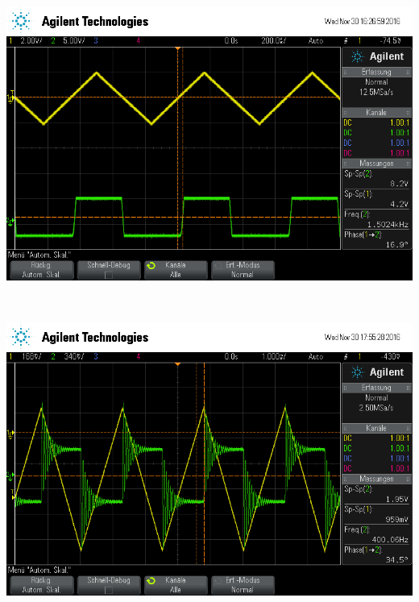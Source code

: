 \documentclass[]{scrartcl}
\begin{document}
\hspace{0.1\textwidth}
\begin{minipage}[t]{0.5\textwidth}
	\includegraphics[width=\textwidth]{images/rechteck_diff}
	\label{fig:rechteckdiff}
\end{minipage} \\
\begin{minipage}[t]{0.5\textwidth}
	\includegraphics[width=\textwidth]{images/dreieck_diff}
	\label{fig:dreieckdiff}
\end{minipage} 
\end{document}
